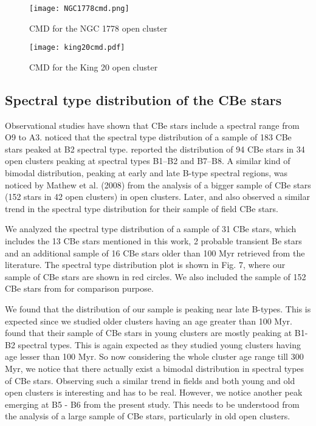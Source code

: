 \documentclass{jaa}
\begin{document}
\begin{figure}
\centering
\texttt{[image: NGC1778cmd.png]}
\caption{CMD for the NGC 1778 open cluster} 
\end{figure}

\begin{figure}
\centering
\texttt{[image: king20cmd.pdf]}
\caption{CMD for the King 20 open cluster} 
\end{figure}

\subsection{Spectral type distribution of the CBe stars}
Observational studies have shown that CBe stars include a spectral range from O9 to A3. \cite{1982Slettebak} noticed that the spectral type distribution of a sample of 183 CBe stars peaked at B2 spectral type. \cite{1982Mermilliod} reported the distribution of 94 CBe stars in 34 open clusters peaking at spectral types B1–B2 and B7–B8. A similar kind of bimodal distribution, peaking at early and late B-type spectral regions, was noticed by Mathew et al. (2008) from the analysis of a bigger sample of CBe stars (152 stars in 42 open clusters) in open clusters. Later, \cite{2017Arcos} and \cite{2020Gourav} also observed a similar trend in the spectral type distribution for their sample of field CBe stars.

We analyzed the spectral type distribution of a sample of 31 CBe stars, which includes the 13 CBe stars mentioned in this work, 2 probable transient Be stars and an additional sample of 16 CBe stars older than 100 Myr retrieved from the literature. The spectral type distribution plot is shown in Fig. 7, where our sample of CBe stars are shown in red circles. We also included the sample of 152 CBe stars from \cite{2008Mathew} for comparison purpose.

We found that the distribution of our sample is peaking near late B-types. This is expected since we studied older clusters having an age greater than 100 Myr. \cite{2008Mathew} found that their sample of CBe stars in young clusters are mostly peaking at B1-B2 spectral types. This is again expected as they studied young clusters having age lesser than 100 Myr. So now considering the whole cluster age range till 300 Myr, we notice that there actually exist a bimodal distribution in spectral types of CBe stars. Observing such a similar trend in fields and both young and old open clusters is interesting and has to be real. However, we notice another peak emerging at B5 - B6 from the present study. This needs to be understood from the analysis of a large sample of CBe stars, particularly in old open clusters.
\end{document}
